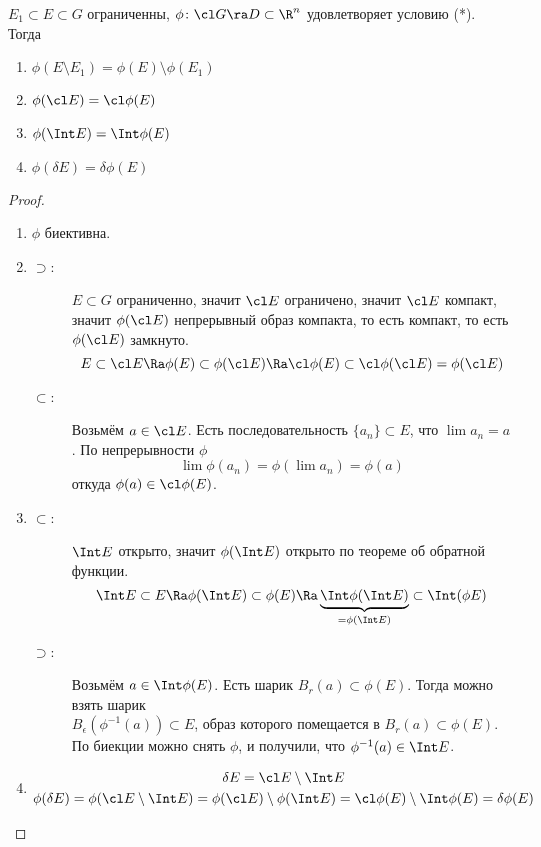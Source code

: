 \begin{lemma}
	$E_1 \subset E \subset G$ ограниченны, $\phi\colon \cl G \ra D \subset \R^n$ удовлетворяет условию (*).
	Тогда
	\begin{enumerate}
		\item $\phi(E \setminus E_1) = \phi(E) \setminus \phi(E_1)$
		\item $\phi(\cl E) = \cl \phi(E)$
		\item $\phi(\Int E) = \Int \phi(E)$
		\item $\phi(\delta E) = \delta \phi(E)$
	\end{enumerate}
\end{lemma}
\begin{proof}\begin{enumerate}
\item
	$\phi$ биективна.

\item
	\begin{description}
	\item[$\supset$:]
		$E \subset G$ ограниченно, значит $\cl E$ ограничено, значит $\cl E$ компакт,
		значит $\phi(\cl E)$ непрерывный образ компакта, то есть компакт, то есть $\phi(\cl E)$ замкнуто.
		\[
			E \subset \cl E \Ra \phi(E) \subset \phi(\cl E) \Ra \cl \phi(E) \subset \cl \phi(\cl E) = \phi(\cl E)
		\]

	\item[$\subset$:]
		Возьмём $a \in \cl E$. Есть последовательность $\{a_n\} \subset E$, что $\lim a_n = a$.
		По непрерывности $\phi$
		\[
			\lim \phi(a_n) = \phi(\lim a_n) = \phi(a)
		\]
		откуда $\phi(a) \in \cl \phi(E)$.
	\end{description}

\item
	\begin{description}
	\item[$\subset$:]
		$\Int E$ открыто, значит $\phi(\Int E)$ открыто по теореме об обратной функции.
		\[
			\Int E \subset E \Ra \phi(\Int E) \subset \phi(E) \Ra \underbrace{\Int \phi(\Int E)}_{= \phi(\Int E)} \subset \Int(\phi E)
		\]

	\item[$\supset$:]
		Возьмём $a \in \Int \phi(E)$.
		Есть шарик $B_r(a) \subset \phi(E)$.
		Тогда можно взять шарик\\ $B_\epsilon(\phi^{-1}(a)) \subset E$, образ которого помещается в $B_r(a) \subset \phi(E)$.
		По биекции можно снять $\phi$, и получили, что $\phi^{-1}(a) \in \Int E$.
	\end{description}

\item
	\begin{gather*}
		\delta E = \cl E \setminus \Int E \\
		\phi(\delta E) = \phi(\cl E \setminus \Int E) = \phi(\cl E) \setminus \phi (\Int E)
		= \cl \phi(E) \setminus \Int \phi(E) = \delta \phi(E)
	\end{gather*}
\end{enumerate}\end{proof}

